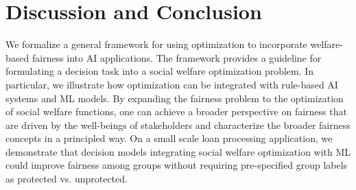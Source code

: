 \documentclass{article}[11pt]
\begin{document}
\section{Discussion and Conclusion} \label{sec:conclusion}
We formalize a general framework for using optimization to incorporate welfare-based fairness into AI applications. The framework provides a guideline for formulating a decision task into a social welfare optimization problem. In particular, we illustrate how optimization can be integrated with rule-based AI systems and ML models. By expanding the fairness problem to the optimization of social welfare functions, one can achieve a broader perspective on fairness that are driven by the well-beings of stakeholders and characterize the broader fairness concepts in a principled way. 
On a small scale loan processing application, we demonstrate that decision models integrating social welfare optimization with ML could improve fairness among groups without requiring pre-specified group labels as protected vs. unprotected.  
\end{document}
